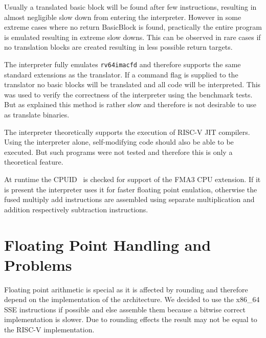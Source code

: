 \documentclass[course=eragp]{aspdoc}
\begin{document}
\par

Usually a translated basic block will be found after few instructions, resulting in almost
negligible slow down from entering the interpreter. However in some extreme cases where no return
BasicBlock is found, practically the entire program is emulated resulting in extreme slow downs.
This can be observed in rare cases if no translation blocks are created resulting in less possible
return targets.

\par

The interpreter fully emulates \texttt{rv64imacfd} and therefore supports the same standard
extensions as the translator. If a command flag is supplied to the translator no
basic blocks will be translated and all code will be interpreted. This was used to verify the
correctness of the interpreter using the benchmark tests. But as explained this method is rather
slow and therefore is not desirable to use as translate binaries.

\par

The interpreter theoretically supports the execution of RISC-V JIT compilers. Using the interpreter
alone, self-modifying code should also be able to be executed. But such programs were not tested and
therefore this is only a theoretical feature.

\par

At runtime the CPUID~\cite{intel2017man} is checked for support of the FMA3 CPU extension. If it is
present the interpreter uses it for faster floating point enulation, otherwise the fused multiply
add instructions are assembled using separate multiplication and addition respectively subtraction
instructions.

\par

\section{Floating Point Handling and Problems}\label{sec:floating_point}

Floating point arithmetic is special as it is affected by rounding and therefore depend on the
implementation of the architecture. We decided to use the x86\_64 SSE instructions if possible and
else assemble them because a bitwise correct implementation is slower. Due to rounding effects the
result may not be equal to the RISC-V implementation.
\end{document}

